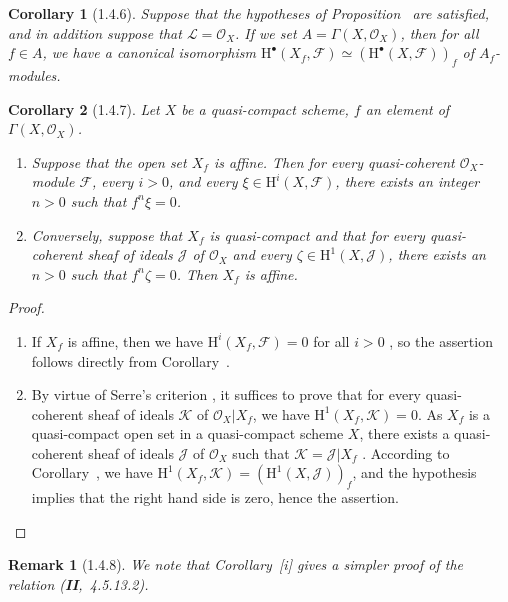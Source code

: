 \documentclass[oneside]{amsart}
\theoremstyle{ega-env-style}
\theoremstyle{ega-thm-env-style}
\newtheorem*{corollary}{Corollary}
\theoremstyle{ega-defn-env-style}
\newtheorem*{remark}{Remark}
\def\mathcal{\mathscr}
\def\sh{\mathcal}                   %
\def\HH{\mathrm{H}}                 %
\def\isoto{\simeq} %
\let\EGAOriginalLabel\label
\renewcommand{\label}[1]{\phantomsection\EGAOriginalLabel{#1}}
\begin{document}
\begin{corollary}[1.4.6]
\label{III.1.4.6}
Suppose that the hypotheses of Proposition~ are satisfied, and in addition suppose that $\sh{L}=\sh{O}_X$.
If we set $A=\Gamma(X,\sh{O}_X)$, then for all $f\in A$, we have a canonical isomorphism $\HH^\bullet(X_f,\sh{F})\isoto(\HH^\bullet(X,\sh{F}))_f$ of $A_f$-modules.
\end{corollary}

\begin{corollary}[1.4.7]
\label{III.1.4.7}
Let $X$ be a quasi-compact scheme, $f$ an element of $\Gamma(X,\sh{O}_X)$.
\begin{enumerate}
  \item[{\rm(i)}] Suppose that the open set $X_f$ is affine.
    Then for every quasi-coherent $\sh{O}_X$-module $\sh{F}$, every $i>0$, and every $\xi\in\HH^i(X,\sh{F})$, there exists an integer $n>0$ such that $f^n\xi=0$.
  \item[{\rm(ii)}] Conversely, suppose that $X_f$ is quasi-compact and that for every quasi-coherent sheaf of ideals $\sh{J}$ of $\sh{O}_X$ and every $\zeta\in\HH^1(X,\sh{J})$, there exists an $n>0$ such that $f^n\zeta=0$.
    Then $X_f$ is affine.
\end{enumerate}
\end{corollary}

\begin{proof}
\medskip\noindent
\begin{enumerate}
  \item[(i)] If $X_f$ is affine, then we have $\HH^i(X_f,\sh{F})=0$ for all $i>0$ , so the assertion follows directly from Corollary~.
  \item[(ii)] By virtue of Serre's criterion , it suffices to prove that for every quasi-coherent sheaf of ideals $\sh{K}$ of $\sh{O}_X|X_f$, we have $\HH^1(X_f,\sh{K})=0$.
    As $X_f$ is a quasi-compact open set in a quasi-compact scheme $X$, there exists a quasi-coherent sheaf of ideals $\sh{J}$ of $\sh{O}_X$ such that $\sh{K}=\sh{J}|X_f$ .
    According to Corollary~, we have $\HH^1(X_f,\sh{K})=(\HH^1(X,\sh{J}))_f$, and the hypothesis implies that the right hand side is zero, hence the assertion.
\end{enumerate}
\end{proof}

\begin{remark}[1.4.8]
\label{III.1.4.8}
We note that Corollary~[i] gives a simpler proof of the relation (\textbf{II},~4.5.13.2).
\end{remark}
\end{document}
